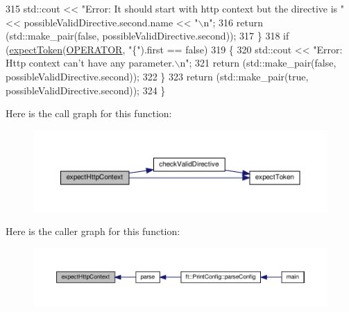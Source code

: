\begin{DoxyCode}
315             std::cout << \textcolor{stringliteral}{"Error: It should start with http context but the directive is "} << 
      possibleValidDirective.second.name << \textcolor{stringliteral}{"\(\backslash\)n"};
316             \textcolor{keywordflow}{return} (std::make\_pair(\textcolor{keyword}{false}, possibleValidDirective.second));
317         \}
318         \textcolor{keywordflow}{if} (\hyperlink{classft_1_1_parser_a1615a752d3642bb53598e2c8db810db0}{expectToken}(\hyperlink{namespaceft_aa520fbf142ba1e7e659590c07da31921a6411d9d6073252e4d316493506bbb979}{OPERATOR}, \textcolor{stringliteral}{"\{"}).first == \textcolor{keyword}{false})
319         \{
320             std::cout << \textcolor{stringliteral}{"Error: Http context can't have any parameter.\(\backslash\)n"};
321             \textcolor{keywordflow}{return} (std::make\_pair(\textcolor{keyword}{false}, possibleValidDirective.second));
322         \}
323         \textcolor{keywordflow}{return} (std::make\_pair(\textcolor{keyword}{true}, possibleValidDirective.second));
324     \}
\end{DoxyCode}
Here is the call graph for this function\+:
\nopagebreak
\begin{figure}[H]
\begin{center}
\leavevmode
\includegraphics[width=350pt]{classft_1_1_parser_abcf864a160e3c4e1866edceae06b921b_cgraph}
\end{center}
\end{figure}
Here is the caller graph for this function\+:
\nopagebreak
\begin{figure}[H]
\begin{center}
\leavevmode
\includegraphics[width=350pt]{classft_1_1_parser_abcf864a160e3c4e1866edceae06b921b_icgraph}
\end{center}
\end{figure}
\mbox{\label{classft_1_1_parser_a002b236022851df6ef2203aab9b24a73}} 
